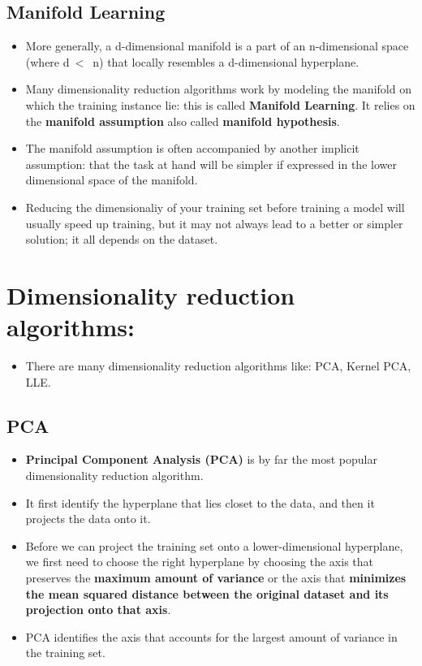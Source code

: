 \documentclass{article}
\begin{document}
	\subsection{Manifold Learning}
	\begin{itemize}
		\item More generally, a d-dimensional manifold is a part of an n-dimensional space (where d$\ < $\ n) that locally resembles a d-dimensional hyperplane.
		\item Many dimensionality reduction algorithms work by modeling the manifold on which the training instance lie: this is called \textbf{Manifold Learning}. It relies on the \textbf{manifold assumption} also called \textbf{manifold hypothesis}.
		\item The manifold assumption is often accompanied by another implicit assumption: that the task at hand will be simpler if expressed in the lower dimensional space of the manifold.
		\item Reducing the dimensionaliy of your training set before training a model will usually speed up training, but it may not always lead to a better or simpler solution; it all depends on the dataset.
	\end{itemize}
	\section{Dimensionality reduction algorithms:}	
	\begin{itemize}
		\item There are many dimensionality reduction algorithms like: PCA, Kernel PCA, LLE.
	\end{itemize}
	\subsection{PCA}
	\begin{itemize}
		\item \textbf{Principal Component Analysis (PCA)} is by far the most popular dimensionality reduction algorithm.
		\item It first identify the hyperplane that lies closet to the data, and then it projects the data onto it.
		\item Before we can project the training set onto a lower-dimensional hyperplane, we first need to choose the right hyperplane by choosing the axis that preserves the \textbf{maximum amount of variance} or the axis that \textbf{minimizes the mean squared distance between the original dataset and its projection onto that axis}.
		\item PCA identifies the axis that accounts for the largest amount of variance in the training set.
	\end{itemize}
\end{document}
